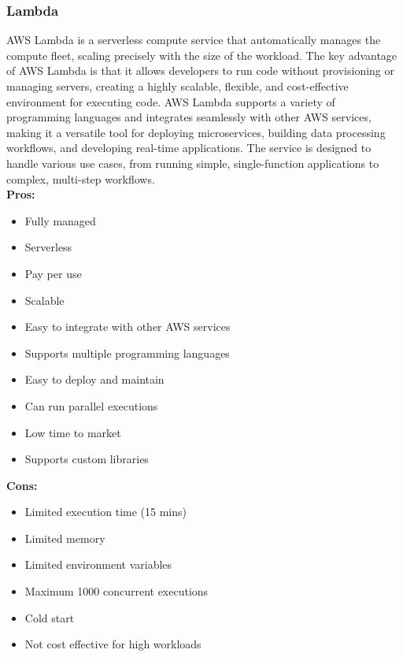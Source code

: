         \subsubsection{Lambda}
        \label{aws:lambda}
        AWS Lambda is a serverless compute service that automatically manages the compute fleet, scaling precisely with the size of the workload. The key advantage of AWS Lambda is that it allows developers to run code without provisioning or managing servers, creating a highly scalable, flexible, and cost-effective environment for executing code. AWS Lambda supports a variety of programming languages and integrates seamlessly with other AWS services, making it a versatile tool for deploying microservices, building data processing workflows, and developing real-time applications. The service is designed to handle various use cases, from running simple, single-function applications to complex, multi-step workflows.\\
        \textbf{Pros:}
        \begin{itemize}
            \item Fully managed
            \item Serverless
            \item Pay per use
            \item Scalable
            \item Easy to integrate with other AWS services
            \item Supports multiple programming languages
            \item Easy to deploy and maintain
            \item Can run parallel executions
            \item Low time to market
            \item Supports custom libraries
        \end{itemize}
        \textbf{Cons:}
        \begin{itemize}
            \item Limited execution time (15 mins)
            \item Limited memory
            \item Limited environment variables
            \item Maximum 1000 concurrent executions
            \item Cold start
            \item Not cost effective for high workloads
        \end{itemize}

